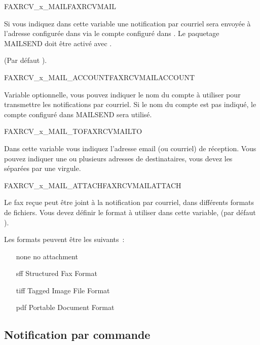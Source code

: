 \begin {description}

 {FAXRCV\_x\_MAIL}{FAXRCVMAIL}

  Si vous indiquez  dans cette variable une notification par courriel
  sera envoyée à l'adresse configurée dans 
  via le compte configuré dans .
  Le paquetage MAILSEND doit être activé avec .

  (Par défaut ).

 {FAXRCV\_x\_MAIL\_ACCOUNT}{FAXRCVMAILACCOUNT}

   Variable optionnelle, vous pouvez indiquer le nom du compte à utiliser pour transmettre
   les notifications par courriel. Si le nom du compte est pas indiqué, le compte 
   configuré dans MAILSEND sera utilisé.

 {FAXRCV\_x\_MAIL\_TO}{FAXRCVMAILTO}

  Dans cette variable vous indiquez l'adresse email (ou courriel) de réception.
  Vous pouvez indiquer une ou plusieurs adresses de destinataires, vous devez
  les séparées par une virgule.

 {FAXRCV\_x\_MAIL\_ATTACH}{FAXRCVMAILATTACH}

  Le fax reçue peut être joint à la notification par courriel, dans différents formats
  de fichiers.
  Vous devez définir le format à utiliser dans cette variable, (par défaut ).

  Les formats peuvent être les suivants~:
  \begin{itemize}
    \item[none] no attachment
    \item[sff] Structured Fax Format
    \item[tiff] Tagged Image File Format
    \item[pdf] Portable Document Format
  \end{itemize}

\end {description}

\subsection{Notification par commande}

